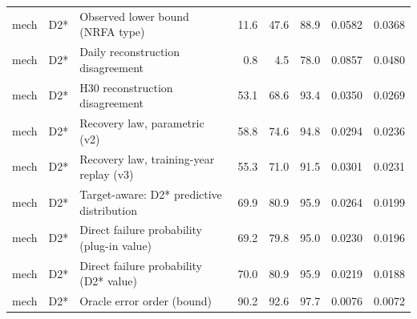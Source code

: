 \begin{table}
{\begin{tabular}{lllrrrrr}
mech & D2* & Observed lower bound (NRFA type) & 11.6 & 47.6 & 88.9 & 0.0582 & 0.0368 \\
mech & D2* & Daily reconstruction disagreement & 0.8 & 4.5 & 78.0 & 0.0857 & 0.0480 \\
mech & D2* & H30 reconstruction disagreement & 53.1 & 68.6 & 93.4 & 0.0350 & 0.0269 \\
mech & D2* & Recovery law, parametric (v2) & 58.8 & 74.6 & 94.8 & 0.0294 & 0.0236 \\
mech & D2* & Recovery law, training-year replay (v3) & 55.3 & 71.0 & 91.5 & 0.0301 & 0.0231 \\
mech & D2* & Target-aware: D2* predictive distribution & 69.9 & 80.9 & 95.9 & 0.0264 & 0.0199 \\
mech & D2* & Direct failure probability (plug-in value) & 69.2 & 79.8 & 95.0 & 0.0230 & 0.0196 \\
mech & D2* & Direct failure probability (D2* value) & 70.0 & 80.9 & 95.9 & 0.0219 & 0.0188 \\
mech & D2* & Oracle error order (bound) & 90.2 & 92.6 & 97.7 & 0.0076 & 0.0072 \\
\bottomrule
\end{tabular}
}
\end{table}

